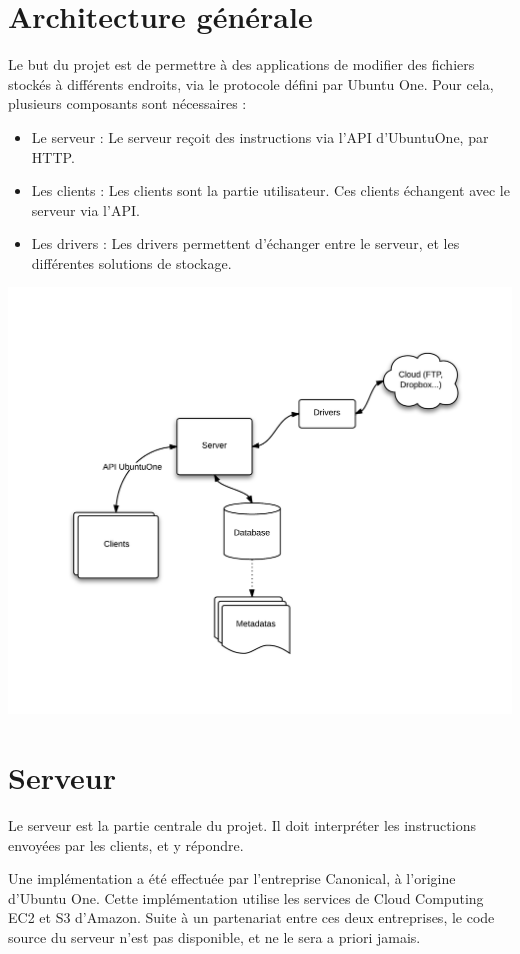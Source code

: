 \section{Architecture générale}
Le but du projet est de permettre à des applications de modifier des fichiers stockés à différents endroits, via le protocole défini par Ubuntu One.
Pour cela, plusieurs composants sont nécessaires :
\begin{itemize} 
   \item Le serveur : Le serveur reçoit des instructions via l'API d'UbuntuOne, par HTTP.
   \item Les clients : Les clients sont la partie utilisateur. Ces clients échangent avec le serveur via l'API. 
   \item Les drivers : Les drivers permettent d'échanger entre le serveur, et les différentes solutions de stockage. 
\end{itemize}

\includegraphics[width=500pt]{architecture.png}

\section{Serveur}
Le serveur est la partie centrale du projet. Il doit interpréter les instructions envoyées par les clients, et y répondre.

Une implémentation a été effectuée par l'entreprise Canonical, à l'origine d'Ubuntu One. Cette implémentation utilise les services de Cloud Computing EC2 et S3 d'Amazon. Suite à un partenariat entre ces deux entreprises, le code source du serveur n'est pas disponible, et ne le sera a priori jamais.

